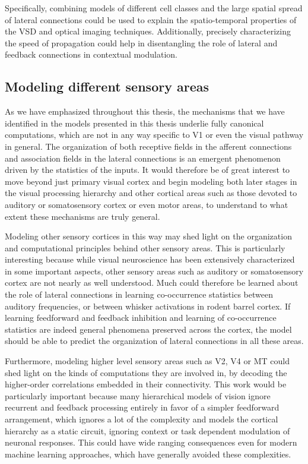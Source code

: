 Specifically, combining models of different cell classes and the large
spatial spread of lateral connections could be used to explain the
spatio-temporal properties of the VSD and optical imaging
techniques. Additionally, precisely characterizing the speed of
propagation could help in disentangling the role of lateral and
feedback connections in contextual modulation.

\subsection{Modeling different sensory areas}

As we have emphasized throughout this thesis, the mechanisms that we
have identified in the models presented in this thesis underlie
fully canonical computations, which are not in any way specific to V1 or
even the visual pathway in general. The organization of both receptive
fields in the afferent connections and association fields in the
lateral connections is an emergent phenomenon driven by the statistics
of the inputs. It would therefore be of great interest to move beyond
just primary visual cortex and begin modeling both later stages in the
visual processing hierarchy and other cortical areas such as those
devoted to auditory or somatosensory cortex or even motor areas, to
understand to what extent these mechanisms are truly general.

Modeling other sensory cortices in this way may shed light on the
organization and computational principles behind other sensory
areas. This is particularly interesting because while visual
neuroscience has been extensively characterized in some important
aspects, other sensory areas
such as auditory or somatosensory cortex are not nearly as well
understood. Much could therefore be learned about the role of
lateral connections in learning co-occurrence statistics between
auditory frequencies, or between whisker activations in rodent barrel
cortex. If learning feedforward and feedback inhibition and learning
of co-occurrence statistics are indeed general phenomena preserved
across the cortex, the model should be able to predict the organization
of lateral connections in all these areas.

Furthermore, modeling higher level sensory areas such as V2, V4 or MT
could shed light on the kinds of computations they are involved in, by
decoding the higher-order correlations embedded in their
connectivity. This work would be particularly important because many hierarchical
models of vision ignore recurrent and feedback processing entirely in
favor of a simpler feedforward arrangement, which ignores a lot of
the complexity and models the cortical hierarchy as a static circuit,
ignoring context or task dependent modulation of neuronal
responses. This could have wide ranging consequences even for modern
machine learning approaches, which have generally avoided these
complexities.

